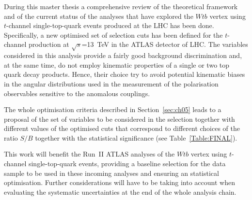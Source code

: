 During this master thesis a comprehensive review of the theoretical framework and of the current status of the analyses that have explored the  $Wtb$ vertex using $t$-channel single-top-quark events produced at the LHC has been done. Specifically, a new optimised set of selection cuts has been defined for the $t$-channel production at $\sqrt{s}$=13~TeV in the ATLAS detector of LHC. The variables considered in this analysis provide a fairly good background discrimination and, at the same time, do not employ kinematic properties of a single or two top quark decay products. Hence, their choice try to avoid potential kinematic biases in the angular distributions used in the measurement of the polarisation observables sensitive to the anomalous couplings.

The whole optimisation criteria described in Section~\ref{sec:ch05} leads to a proposal of the set of variables to be considered in the selection together with different values of the optimised cuts that correspond to different choices of the ratio $S/B$ together with the statistical significance (see Table~\ref{Table:FINAL}).


This work will benefit the Run~II ATLAS analyses of the $Wtb$ vertex using $t$-channel single-top-quark events, providing a baseline selection for the data sample to be used in these incoming analyses and ensuring an statistical optimisation. Further considerations will have to be taking into account when evaluating the systematic uncertainties at the end of the whole analysis chain.







\newpage